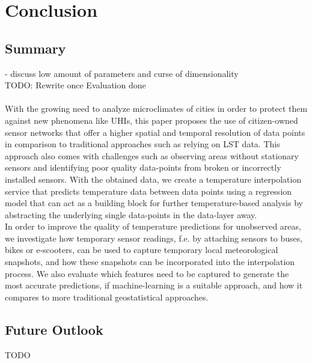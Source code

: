 \chapter{Conclusion}
\label{chap:Conclusion}

\section{Summary}

- discuss low amount of parameters and curse of dimensionality\\

TODO: Rewrite once Evaluation done\\
\\

With the growing need to analyze microclimates of cities in order to protect them against new phenomena like UHIs, this paper proposes the use of citizen-owned sensor networks that offer a higher spatial and temporal resolution of data points in comparison to traditional approaches such as relying on LST data. This approach also comes with challenges such as observing areas without stationary sensors and identifying poor quality data-points from broken or incorrectly installed sensors. With the obtained data, we create a temperature interpolation service that predicts temperature data between data points using a regression model that can act as a building block for further temperature-based analysis by abstracting the underlying single data-points in the data-layer away.\\
In order to improve the quality of temperature predictions for unobserved areas, we investigate how temporary sensor readings, f.e. by attaching sensors to buses, bikes or e-scooters, can be used to capture temporary local meteorological snapshots, and how these snapshots can be incorporated into the interpolation process. We also evaluate which features need to be captured to generate the most accurate predictions, if machine-learning is a suitable approach, and how it compares to more traditional geostatistical approaches.

\section{Future Outlook}

TODO